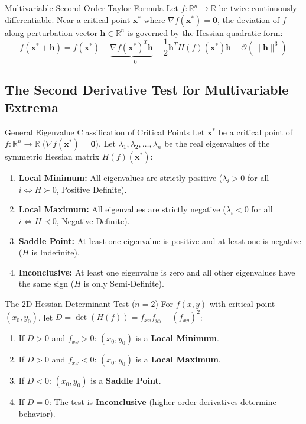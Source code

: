 \begin{theorembox}{Multivariable Second-Order Taylor Formula}
Let $f: \mathbb{R}^n \to \mathbb{R}$ be twice continuously differentiable. Near a critical point $\mathbf{x}^*$ where $\nabla f(\mathbf{x}^*) = \mathbf{0}$, the deviation of $f$ along perturbation vector $\mathbf{h} \in \mathbb{R}^n$ is governed by the Hessian quadratic form:
\begin{equation}
f(\mathbf{x}^* + \mathbf{h}) = f(\mathbf{x}^*) + \underbrace{\nabla f(\mathbf{x}^*)^T \mathbf{h}}_{= 0} + \frac{1}{2} \mathbf{h}^T H(f)(\mathbf{x}^*) \mathbf{h} + \mathcal{O}(\|\mathbf{h}\|^3)
\end{equation}
\end{theorembox}

\subsection{The Second Derivative Test for Multivariable Extrema}

\begin{theorembox}{General Eigenvalue Classification of Critical Points}
Let $\mathbf{x}^*$ be a critical point of $f: \mathbb{R}^n \to \mathbb{R}$ ($\nabla f(\mathbf{x}^*) = \mathbf{0}$). Let $\lambda_1, \lambda_2, \dots, \lambda_n$ be the real eigenvalues of the symmetric Hessian matrix $H(f)(\mathbf{x}^*)$:
\begin{enumerate}
    \item \textbf{Local Minimum:} All eigenvalues are strictly positive ($\lambda_i > 0$ for all $i \iff H \succ 0$, Positive Definite).
    \item \textbf{Local Maximum:} All eigenvalues are strictly negative ($\lambda_i < 0$ for all $i \iff H \prec 0$, Negative Definite).
    \item \textbf{Saddle Point:} At least one eigenvalue is positive and at least one is negative ($H$ is Indefinite).
    \item \textbf{Inconclusive:} At least one eigenvalue is zero and all other eigenvalues have the same sign ($H$ is only Semi-Definite).
\end{enumerate}
\end{theorembox}

\begin{theorembox}{The 2D Hessian Determinant Test ($n = 2$)}
For $f(x, y)$ with critical point $(x_0, y_0)$, let $D = \det(H(f)) = f_{xx} f_{yy} - (f_{xy})^2$:
\begin{enumerate}
    \item If $D > 0$ and $f_{xx} > 0$: $(x_0, y_0)$ is a \textbf{Local Minimum}.
    \item If $D > 0$ and $f_{xx} < 0$: $(x_0, y_0)$ is a \textbf{Local Maximum}.
    \item If $D < 0$: $(x_0, y_0)$ is a \textbf{Saddle Point}.
    \item If $D = 0$: The test is \textbf{Inconclusive} (higher-order derivatives determine behavior).
\end{enumerate}
\end{theorembox}

